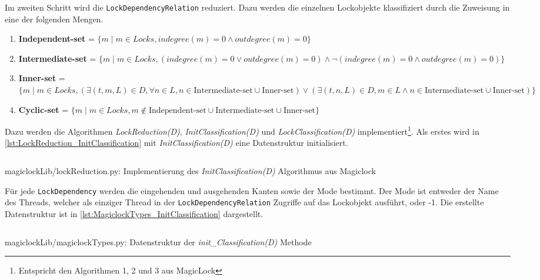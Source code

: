 Im zweiten Schritt wird die \texttt{LockDependencyRelation} reduziert. Dazu
werden die einzelnen Lockobjekte klassifiziert durch die Zuweisung in eine der
folgenden Mengen\autocite[4]{MagicLock}.
\begin{enumerate}
  \item \textbf{Independent-set} = $\{m \mid m \in Locks, indegree(m) = 0 \land
  outdegree(m) = 0\}$
  \item \textbf{Intermediate-set} = $\{m \mid m \in Locks, (indegree(m) = 0 \lor
  outdegree(m) = 0) \land \lnot (indegree(m) = 0 \land outdegree(m) = 0)\}$
  \item \textbf{Inner-set} = $\{m \mid m \in Locks, (\exists (t,m,L) \in D,
  \forall n \in L, n \in \text{Intermediate-set} \cup \text{Inner-set}) \lor
  (\exists (t,n,L) \in D, m \in L \land n \in \text{Intermediate-set} \cup
  \text{Inner-set})\}$
  \item \textbf{Cyclic-set} = $\{m \mid m \in Locks, m \notin
  \text{Independent-set} \cup \text{Intermediate-set} \cup \text{Inner-set}\}$
\end{enumerate}
Dazu werden die Algorithmen \emph{LockReduction(D)},
\emph{InitClassification(D)} und \emph{LockClassification(D)}
implementiert\footnote{Entspricht den Algorithmen 1, 2 und 3 aus
MagicLock\autocite[5]{MagicLock}}. Als erstes wird in
\cref{lst:LockReduction_InitClassification} mit \emph{InitClassification(D)}
eine Datenstruktur initialisiert.
\begin{listing}[ht]
  \inputminted[frame=lines,linenos,firstline=17,lastline=32]{python}{./Python/magiclockLib/lockReduction.py}
  \caption{magiclockLib/lockReduction.py: Implementierung des \emph{InitClassification(D)} Algorithmus aus Magiclock\autocite[5]{MagicLock}}
  \label{lst:LockReduction_InitClassification}
\end{listing}
Für jede \texttt{LockDependency} werden die eingehenden und ausgehenden Kanten
sowie der Mode bestimmt. Der Mode ist entweder der Name des Threads, welcher als
einziger Thread in der \texttt{LockDependencyRelation} Zugriffe auf das
Lockobjekt ausführt, oder -1. Die erstellte Datenstruktur ist in
\cref{lst:MagiclockTypes_InitClassification} dargestellt.
\begin{listing}[ht]
  \inputminted[frame=lines,linenos,firstline=3,lastline=8]{python}{./Python/magiclockLib/magiclockTypes.py}
  \caption{magiclockLib/magiclockTypes.py: Datenstruktur der \emph{init\_Classification(D)} Methode}
  \label{lst:MagiclockTypes_InitClassification}
\end{listing}
